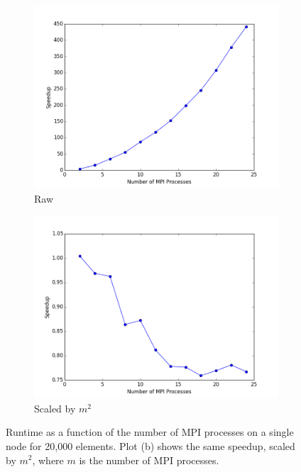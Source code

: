 \documentclass[10pt]{article}
\begin{document}
\begin{figure}[H]
        \centering
        \begin{subfigure}[b]{0.5\textwidth}
                \centering
                \includegraphics[width=\textwidth]{../figures/unscaled-mpi.png}
                \caption{Raw}
        \end{subfigure}%
                \begin{subfigure}[b]{0.5\textwidth}
                \centering
                \includegraphics[width=\textwidth]{../figures/scaled-mpi.png}
                \caption{Scaled by \(m^2\)}
        \end{subfigure}%
\caption{Runtime as a function of the number of MPI processes on a single node for 20,000 elements. Plot (b) shows the same speedup, scaled by \(m^2\), where \(m\) is the number of MPI processes.}
        \label{fig:speedupMPI}
\end{figure}
\end{document}
